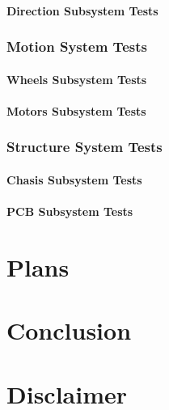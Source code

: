 \documentclass[a4paper,12pt]{article}
\begin{document}
	\paragraph{Direction Subsystem Tests}


	\subsubsection{Motion System Tests}
	
	\paragraph{Wheels Subsystem Tests}	
		
	\paragraph{Motors Subsystem Tests}
	
	
	\subsubsection{Structure System Tests}
	
	\paragraph{Chasis Subsystem Tests}	
		
	\paragraph{PCB Subsystem Tests}


\section{Plans}


\section{Conclusion}



\section{Disclaimer}
\end{document}
